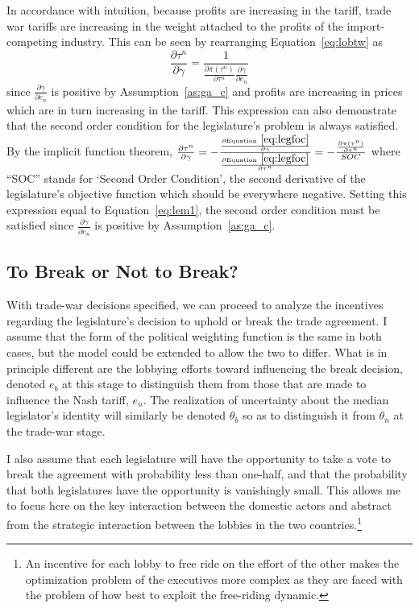 \documentclass[10pt]{article}
\newcommand{\ve}{\theta}
\newcommand{\ga}{\gamma}
\begin{document}
In accordance with intuition, because profits are increasing in the tariff, trade war tariffs are increasing in the weight attached to the profits of the import-competing industry. This can be seen by rearranging Equation~\ref{eq:lobtw} as 
\begin{equation}
  \frac{\partial \tau^n}{\partial \ga} = \frac{1}{\frac{\partial \pi(\tau^n)}{\partial \tau^n} \frac{\partial \ga}{\partial e_n}}
	\label{eq:lem1}
\end{equation}
since $\frac{\partial \ga}{\partial e_n}$ is positive by Assumption~\ref{as:ga_c} and profits are increasing in prices which are in turn increasing in the tariff. This expression can also demonstrate that the second order condition for the legislature's problem is always satisfied. By the implicit function theorem, $\frac{\partial \tau^n}{\partial \ga} = -\frac{\frac{\partial \text{Equation}~\ref{eq:legfoc}}{\partial \ga}}{\frac{\partial \text{Equation}~\ref{eq:legfoc}}{\partial \tau^n}} = -\frac{\frac{\partial \pi(\tau^n)}{\partial \tau^n}}{SOC}$ where ``SOC'' stands for `Second Order Condition', the second derivative of the legislature's objective function which should be everywhere negative. Setting this expression equal to Equation~\ref{eq:lem1}, the second order condition must be satisfied since $\frac{\partial \ga}{\partial e_n}$ is positive by Assumption~\ref{as:ga_c}.


\bigskip
\subsection{To Break or Not to Break?}
With trade-war decisions specified, we can proceed to analyze the incentives regarding the legislature's decision to uphold or break the trade agreement. I assume that the form of the political weighting function is the same in both cases, but the model could be extended to allow the two to differ. What is in principle different are the lobbying efforts toward influencing the break decision, denoted $e_b$ at this stage to distinguish them from those that are made to influence the Nash tariff, $e_n$. The realization of uncertainty about the median legislator's identity will similarly be denoted $\ve_b$ so as to distinguish it from $\ve_n$ at the trade-war stage. 

I also assume that each legislature will have the opportunity to take a vote to break the agreement with probability less than one-half, and that the probability that both legislatures have the opportunity is vanishingly small. This allows me to focus here on the key interaction between the domestic actors and abstract from the strategic interaction between the lobbies in the two countries.\footnote{An incentive for each lobby to free ride on the effort of the other makes the optimization problem of the executives more complex as they are faced with the problem of how best to exploit the free-riding dynamic.}
\end{document}
